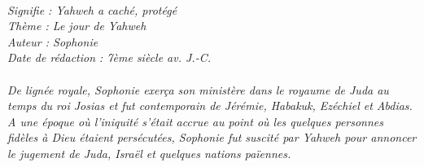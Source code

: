 \BFont
\noindent\hrulefill
{\footnotesize
\textit{
\bigskip
{\centering{}
\\Signifie : Yahweh a caché, protégé
\\Thème : Le jour de Yahweh
\\Auteur : Sophonie
\\Date de rédaction : 7ème siècle av. J.-C.\\}
}
\textit{
\\De lignée royale, Sophonie exerça son ministère dans le royaume de Juda au temps du roi Josias et fut contemporain de Jérémie, Habakuk, Ezéchiel et Abdias. A une époque où l’iniquité s’était accrue au point où les quelques personnes fidèles à Dieu étaient persécutées, Sophonie fut suscité par Yahweh pour annoncer le jugement de Juda, Israël et quelques nations païennes.\bigskip
}
}
\par\nobreak\noindent\hrulefill
